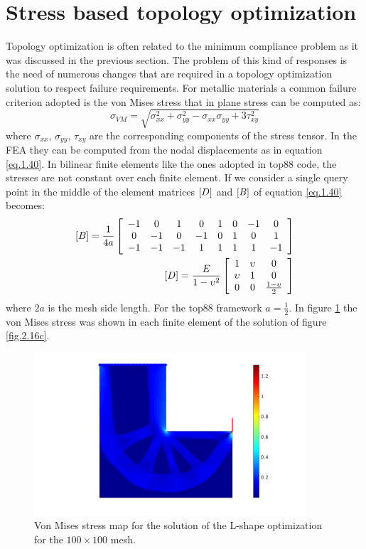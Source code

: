 \section{Stress based topology optimization}
\label{Sec2.3}
Topology optimization is often related to the minimum compliance problem as it was discussed in the previous section. The problem of this kind of responses is the need of numerous changes that are required in a topology optimization solution to respect failure requirements. For metallic materials a common failure criterion adopted is the von Mises stress that in plane stress can be computed as:
\begin{equation}
\sigma_{VM}=\sqrt{\sigma_{xx}^2+\sigma_{yy}^2-\sigma_{xx}\sigma_{yy}+3\tau_{xy}^2}
\end{equation}
where $\sigma_{xx}$, $\sigma_{yy}$, $\tau_{xy}$ are the corresponding components of the stress tensor. In the FEA they can be computed from the nodal displacements as in equation \ref{eq.1.40}. In bilinear finite elements like the ones adopted in top88 code, the stresses are not constant over each finite element. If we consider a single query point in the middle of the element matrices $\left[{D}\right]$ and $\left[{B}\right]$ of equation \ref{eq.1.40} becomes:
\begin{eqnarray}
\left[{B}\right]=\frac{1}{4a}\left[{\begin{array}{cccccccc}
-1 & 0 & 1 & 0 & 1 & 0 & -1 & 0\\
0 & -1 & 0 & -1 & 0 & 1 & 0 & 1\\
-1 & -1 & -1 & 1 & 1 & 1 & 1 & -1
\end{array}}\right]\\
\left[{D}\right]=\frac{E}{1-\upsilon^2}\left[{\begin{array}{ccc}
1 & \upsilon & 0 \\
\upsilon & 1 & 0 \\
0 & 0 & \frac{1-\upsilon}{2}
\end{array}}\right]
\end{eqnarray}
where $2a$ is the mesh side length. For the top88 framework $a=\frac{1}{2}$.  
In figure \ref{fig.2.17} the von Mises stress was shown in each finite element of the solution of figure \ref{fig.2.16c}. 
\begin{figure}[ht]
\centering
\includegraphics[width=0.9\textwidth]{images/Ch2/L-shapenelx_100nely_100_R_8_volfrac_40_ft_3VM_stress}
\caption{Von Mises stress map for the solution of the L-shape optimization for the $100\times100$ mesh.}
\label{fig.2.17}
\end{figure}
